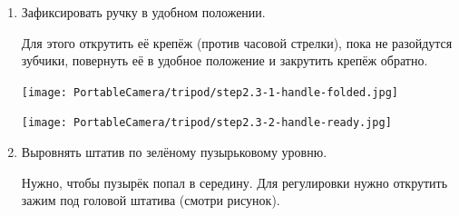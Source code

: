 \begin{enumerate}
\begin{enumerate}
          \item Зафиксировать ручку в удобном положении.
                \par Для этого открутить её крепёж (против часовой стрелки), пока не разойдутся зубчики, повернуть её в удобное положение и закрутить крепёж обратно.

                \begin{minipage}[c]{0.43\textwidth}
                  \centering
                  \texttt{[image: PortableCamera/tripod/step2.3-1-handle-folded.jpg]}
                \end{minipage}
                \hfill
                \begin{minipage}[c]{0.43\textwidth}
                  \centering
                  \texttt{[image: PortableCamera/tripod/step2.3-2-handle-ready.jpg]}
                \end{minipage}

          \item Выровнять штатив по зелёному пузырьковому уровню.
                \par Нужно, чтобы пузырёк попал в середину. Для регулировки нужно открутить зажим под головой штатива (смотри рисунок).


\end{enumerate}
\end{enumerate}
